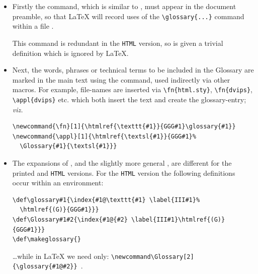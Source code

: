 \begin{itemize}
\item
Firstly the  command, which is similar to ,
must appear in the document preamble, so that \LaTeX{} will record
uses of the \verb|\glossary{...}| command within a file .

This command is redundant in the \texttt{HTML} version, so is given a trivial
definition which is ignored by \LaTeX{}.\par

\item
Next, the words, phrases or technical terms to be included in the Glossary
are marked in the main text using the  command, used indirectly
via other macros. For example, file-names are inserted via 
\verb|\|\verb|fn{html.sty}|, \verb|\|\verb|fn{dvips}|,  \verb|\|\verb|appl{dvips}| etc. 
which both insert the text and create the glossary-entry; \textit{viz.}
%
\begin{small}
\begin{verbatim}
\newcommand{\fn}[1]{\htmlref{\texttt{#1}}{GGG#1}\glossary{#1}}
\newcommand{\appl}[1]{\htmlref{\textsl{#1}}{GGG#1}%
  \Glossary{#1}{\textsl{#1}}}
\end{verbatim}
\end{small}

\item
The expansions of , and the slightly more general 
, are different for the printed and \texttt{HTML} versions.
For the \texttt{HTML} version the following definitions occur 
within an  environment:
%
\begin{small}
\begin{verbatim}
\def\glossary#1{\index{#1@\texttt{#1} \label{III#1}%
  \htmlref{(G)}{GGG#1}}}
\def\Glossary#1#2{\index{#1@{#2} \label{III#1}\htmlref{(G)}{GGG#1}}}
\def\makeglossary{}
\end{verbatim}
\end{small}
%
\dots while in \LaTeX{} we need only:\quad
\verb|\newcommand\Glossary[2]{\glossary{#1@#2}}|~.


\end{itemize}
